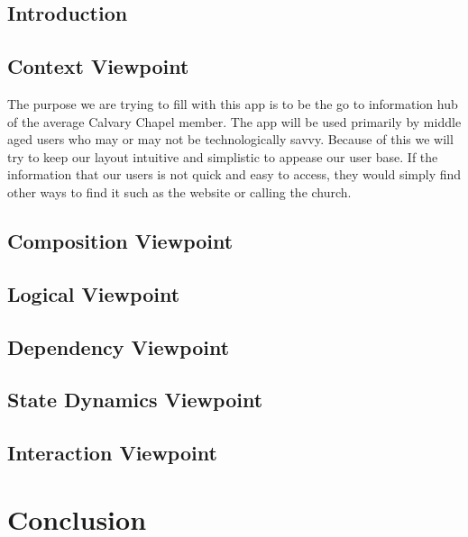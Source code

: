 \documentclass[letterpaper,10pt,draftclsnofoot,onecolumn,titlepage]{IEEEtran}
\begin{document}
		\subsection{Introduction}
		
		\subsection{Context Viewpoint}
		The purpose we are trying to fill with this app is to be the go to information hub of the average Calvary Chapel member. 
		The app will be used primarily by middle aged users who may or may not be technologically savvy. 
		Because of this we will try to keep our layout intuitive and simplistic to appease our user base. 
		If the information that our users is not quick and easy to access, they would simply find other ways to find it such as the website or calling the church.
		\subsection{Composition Viewpoint}
		
		\subsection{Logical Viewpoint}
		
		\subsection{Dependency Viewpoint}
		
		\subsection{State Dynamics Viewpoint}
		
		\subsection{Interaction Viewpoint}
		
	\section{Conclusion}
	
	
\end{document}
